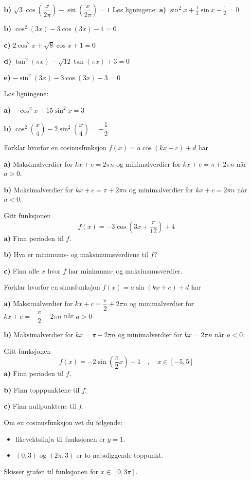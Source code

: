 \textbf{b)} $ \sqrt{3} \cos\left(\dfrac{x}{2\pi}\right) - \sin\left(\dfrac{x}{2\pi}\right)=1 $\os
\nes
\newpage
{}
Løs ligningene:\os
\textbf{a)} $ \sin^2 x+\frac{1}{2}\sin x-\frac{1}{2}=0 $\os

\textbf{b)} $ \cos^2 (3x) -3\cos (3x) -4=0$\os

\textbf{c)} $ 2\cos^2 x+ \sqrt{8} \cos x+1=0 $\os

\textbf{d)} $ \tan^2 (\pi x) -\sqrt{12}\tan (\pi x) +  3=0$\os

\textbf{e)} $ -\sin^2(3x)- 3\cos (3x) -3=0$ \os


Løs ligningene:\os

\textbf{a)} $ -\cos^2 x+15\sin^2 x = 3 $ 

\textbf{b)} $ \cos^2 \left(\dfrac{x}{4}\right) - 2 \sin^2 \left(\dfrac{x}{4}\right) = -\dfrac{1}{2} $

\nes
{}	
Forklar hvorfor en cosinusfunksjon $ f(x)=a\cos(kx+c)+d $ har\os

\textbf{a)} Maksimalverdier for $ kx+c= 2\pi n$ og minimalverdier for $ kx+c= \pi + 2\pi n $ når $ a>0 $.\os

\textbf{b)} Maksimalverdier for $ kx+c= \pi+2\pi n$ og minimalverdier for $ kx+c= 2\pi n $ når $ a<0 $. 

Gitt funksjonen 
\[ f(x)=-3\cos\left(3x+\frac{\pi}{12}\right)+4 \]
\textbf{a)} Finn perioden til $ f $.\os

\textbf{b)} Hva er minimums- og maksimumsverdiene til $ f $?\os

\textbf{c)} Finn alle $ x $ hvor $ f $ har minimums- og maksimumsverdier.

\newpage
{}
Forklar hvorfor en sinusfunksjon $ f(x)=a\sin(kx+c)+d $ har\os

\textbf{a)} Maksimalverdier for $ kx+c=\dfrac{\pi}{2}+ 2\pi n$ og minimalverdier for $ kx+c= -\dfrac{\pi}{2} + 2\pi n $ når $ a>0 $.\os

\textbf{b)} Maksimalverdier for $ kx= \pi+2\pi n$ og minimalverdier for $ kx= 2\pi n $ når $ a<0 $. 

Gitt funksjonen 
\[ f(x)=-2\sin\left(\frac{\pi}{2}x\right)+1 \quad, \quad x\in[-5, 5]\]
\textbf{a)} Finn perioden til $ f $.\os

\textbf{b)} Finn topppunktene til $ f $. \os

\textbf{c)} Finn nullpunktene til $ f $.\os

Om en cosinusfunksjon vet du følgende:
\begin{itemize}
	\item likevektslinja til funksjonen er $ y=1 $.
	\item $ (0,3) $ og $ (2\pi, 3) $ er to naboliggende toppunkt.
\end{itemize}
Skisser grafen til funksjonen for ${ x\in[0, 3\pi]} $.

